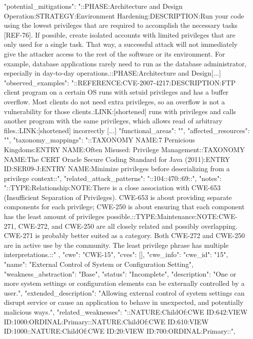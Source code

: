 \begin{code}
{{{{{        "potential_mitigations": "::PHASE:Architecture and Design Operation:STRATEGY:Environment Hardening:DESCRIPTION:Run your code using the lowest privileges that are required to accomplish the necessary tasks [REF-76]. If possible, create isolated accounts with limited privileges that are only used for a single task. That way, a successful attack will not immediately give the attacker access to the rest of the software or its environment. For example, database applications rarely need to run as the database administrator, especially in day-to-day operations.::PHASE:Architecture and Design[...]
        "observed_examples": "::REFERENCE:CVE-2007-4217:DESCRIPTION:FTP client program on a certain OS runs with setuid privileges and has a buffer overflow. Most clients do not need extra privileges, so an overflow is not a vulnerability for those clients.:LINK:[shortened] runs with privileges and calls another program with the same privileges, which allows read of arbitrary files.:LINK:[shortened] incorrectly [...]
        "functional_areas": "",
        "affected_resources": "",
        "taxonomy_mappings": "::TAXONOMY NAME:7 Pernicious Kingdoms:ENTRY NAME:Often Misused: Privilege Management::TAXONOMY NAME:The CERT Oracle Secure Coding Standard for Java (2011):ENTRY ID:SER09-J:ENTRY NAME:Minimize privileges before deserializing from a privilege context::",
        "related_attack_patterns": "::104::470::69::",
        "notes": "::TYPE:Relationship:NOTE:There is a close association with CWE-653 (Insufficient Separation of Privileges). CWE-653 is about providing separate components for each privilege; CWE-250 is about ensuring that each component has the least amount of privileges possible.::TYPE:Maintenance:NOTE:CWE-271, CWE-272, and CWE-250 are all closely related and possibly overlapping. CWE-271 is probably better suited as a category. Both CWE-272 and CWE-250 are in active use by the community. The least privilege phrase has multiple interpretations.::"
       }
      },
      {
       "cwe": "CWE-15",
       "cves": [],
       "cwe_info": {
        "cwe_id": "15",
        "name": "External Control of System or Configuration Setting",
        "weakness_abstraction": "Base",
        "status": "Incomplete",
        "description": "One or more system settings or configuration elements can be externally controlled by a user.",
        "extended_description": "Allowing external control of system settings can disrupt service or cause an application to behave in unexpected, and potentially malicious ways.",
        "related_weaknesses": "::NATURE:ChildOf:CWE ID:642:VIEW ID:1000:ORDINAL:Primary::NATURE:ChildOf:CWE ID:610:VIEW ID:1000::NATURE:ChildOf:CWE ID:20:VIEW ID:700:ORDINAL:Primary::",
}}}}}
\end{code}
